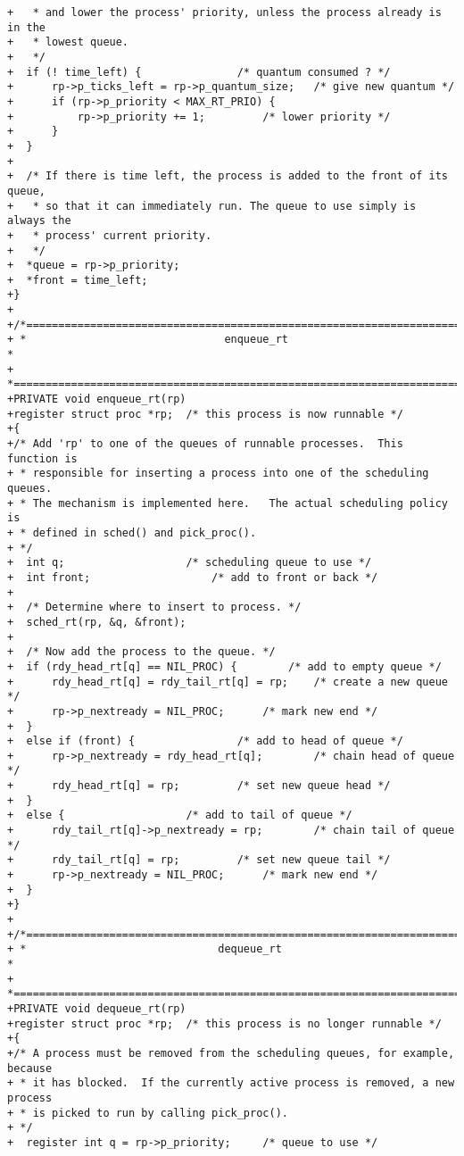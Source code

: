 \begin{verbatim}
+   * and lower the process' priority, unless the process already is in the 
+   * lowest queue.  
+   */
+  if (! time_left) {				/* quantum consumed ? */
+      rp->p_ticks_left = rp->p_quantum_size; 	/* give new quantum */
+      if (rp->p_priority < MAX_RT_PRIO) {  	 
+          rp->p_priority += 1;			/* lower priority */
+      }
+  }
+
+  /* If there is time left, the process is added to the front of its queue, 
+   * so that it can immediately run. The queue to use simply is always the
+   * process' current priority. 
+   */
+  *queue = rp->p_priority;
+  *front = time_left;
+}
+
+/*===========================================================================*
+ *                               enqueue_rt                                  * 
+ *===========================================================================*/
+PRIVATE void enqueue_rt(rp)
+register struct proc *rp;	/* this process is now runnable */
+{
+/* Add 'rp' to one of the queues of runnable processes.  This function is 
+ * responsible for inserting a process into one of the scheduling queues. 
+ * The mechanism is implemented here.   The actual scheduling policy is
+ * defined in sched() and pick_proc().
+ */
+  int q;	 				/* scheduling queue to use */
+  int front;					/* add to front or back */
+
+  /* Determine where to insert to process. */
+  sched_rt(rp, &q, &front);
+
+  /* Now add the process to the queue. */
+  if (rdy_head_rt[q] == NIL_PROC) {		/* add to empty queue */
+      rdy_head_rt[q] = rdy_tail_rt[q] = rp;	/* create a new queue */
+      rp->p_nextready = NIL_PROC;		/* mark new end */
+  } 
+  else if (front) {				/* add to head of queue */
+      rp->p_nextready = rdy_head_rt[q];		/* chain head of queue */
+      rdy_head_rt[q] = rp;			/* set new queue head */
+  } 
+  else {					/* add to tail of queue */
+      rdy_tail_rt[q]->p_nextready = rp;		/* chain tail of queue */	
+      rdy_tail_rt[q] = rp;			/* set new queue tail */
+      rp->p_nextready = NIL_PROC;		/* mark new end */
+  }
+}
+
+/*===========================================================================*
+ *                              dequeue_rt                                   * 
+ *===========================================================================*/
+PRIVATE void dequeue_rt(rp)
+register struct proc *rp;	/* this process is no longer runnable */
+{
+/* A process must be removed from the scheduling queues, for example, because
+ * it has blocked.  If the currently active process is removed, a new process
+ * is picked to run by calling pick_proc().
+ */
+  register int q = rp->p_priority;		/* queue to use */

\end{verbatim}
